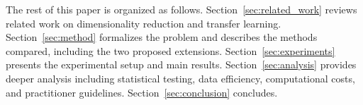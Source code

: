 The rest of this paper is organized as follows. Section~\ref{sec:related_work} reviews related work on dimensionality reduction and transfer learning. Section~\ref{sec:method} formalizes the problem and describes the methods compared, including the two proposed extensions. Section~\ref{sec:experiments} presents the experimental setup and main results. Section~\ref{sec:analysis} provides deeper analysis including statistical testing, data efficiency, computational costs, and practitioner guidelines. Section~\ref{sec:conclusion} concludes.

